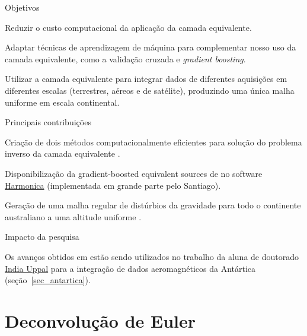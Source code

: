 \documentclass[12pt,a4paper,oneside]{book}
\newcommand{\IndiaLink}{\href{https://www.compgeolab.org/team/\#indiauppal}{India Uppal}}
\begin{document}
\begin{fancyenum}{\faBullseye}{Objetivos}
  \item Reduzir o custo computacional da aplicação da camada equivalente.
  \item Adaptar técnicas de aprendizagem de máquina para complementar nosso
    uso da camada equivalente, como a validação cruzada e \textit{gradient
    boosting}.
  \item Utilizar a camada equivalente para integrar dados de diferentes
    aquisições em diferentes escalas (terrestres, aéreos e de satélite),
    produzindo uma única malha uniforme em escala continental.
\end{fancyenum}
\begin{fancyenum}{\faLightbulb}{Principais contribuições}
  \item Criação de dois métodos computacionalmente eficientes para solução do
    problema inverso da camada equivalente \citep{OliveiraJr2013,Soler2021}.
  \item Disponibilização da gradient-boosted equivalent sources de
    \citet{Soler2021} no software
    \href{https://www.fatiando.org/harmonica/}{Harmonica} (implementada em
    grande parte pelo Santiago).
  \item Geração de uma malha regular de distúrbios da gravidade para todo o
    continente australiano a uma altitude uniforme \citep{Soler2021}.
\end{fancyenum}
\begin{fancyenum}{\faRocket}{Impacto da pesquisa}
  \item Os avanços obtidos em \citet{Soler2021} estão sendo utilizados no
    trabalho da aluna de doutorado \IndiaLink{} para a integração de dados
    aeromagnéticos da Antártica (seção~\ref{sec_antartica}).
\end{fancyenum}


\section{Deconvolução de Euler}
\label{sec_euler}
\end{document}
